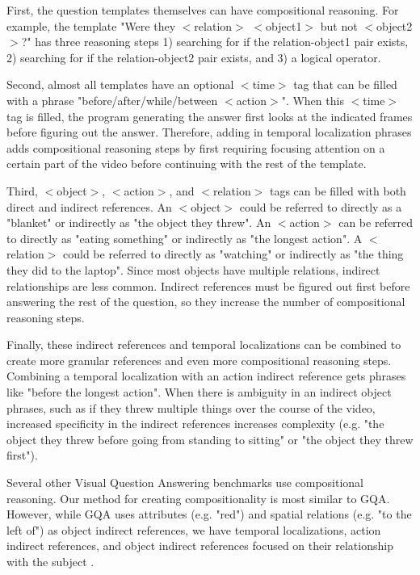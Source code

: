 \documentclass[10pt,twocolumn,letterpaper]{article}
\begin{document}
First, the question templates themselves can have compositional reasoning. For example, the template "Were they $<$relation$>$ $<$object1$>$ but not $<$object2$>$?" has three reasoning steps 1) searching for if the relation-object1 pair exists, 2) searching for if the relation-object2 pair exists, and 3) a logical operator. 

Second, almost all templates have an optional $<$time$>$ tag that can be filled with a phrase "before/after/while/between $<$action$>$". When this $<$time$>$ tag is filled, the program generating the answer first looks at the indicated frames before figuring out the answer. Therefore, adding in temporal localization phrases adds compositional reasoning steps by first requiring focusing attention on a certain part of the video before continuing with the rest of the template.

Third, $<$object$>$, $<$action$>$, and $<$relation$>$ tags can be filled with both direct and indirect references. An $<$object$>$ could be referred to directly as a "blanket" or indirectly as "the object they threw". An $<$action$>$ can be referred to directly as "eating something" or indirectly as "the longest action". A $<$relation$>$ could be referred to directly as "watching" or indirectly as "the thing they did to the laptop". Since most objects have multiple relations, indirect relationships are less common. Indirect references must be figured out first before answering the rest of the question, so they increase the number of compositional reasoning steps.

Finally, these indirect references and temporal localizations can be combined to create more granular references and even more compositional reasoning steps. Combining a temporal localization with an action indirect reference gets phrases like "before the longest action". When there is ambiguity in an indirect object phrases, such as if they threw multiple things over the course of the video, increased specificity in the indirect references increases complexity (e.g. "the object they threw before going from standing to sitting" or "the object they threw first").

Several other Visual Question Answering benchmarks use compositional reasoning. Our method for creating compositionality is most similar to GQA. However, while GQA uses attributes (e.g. "red") and spatial relations (e.g. "to the left of") as object indirect references, we have temporal localizations, action indirect references, and object indirect references focused on their relationship with the subject \cite{hudson2019gqa}. 
\end{document}
